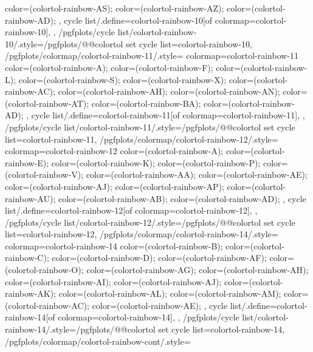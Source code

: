 {{{      color=(colortol-rainbow-AS);
      color=(colortol-rainbow-AZ);
      color=(colortol-rainbow-AD);
    },
    cycle list/.define={colortol-rainbow-10}{[of colormap=colortol-rainbow-10]},
  },
  /pgfplots/cycle list/colortol-rainbow-10/.style={/pgfplots/@@colortol set cycle list={colortol-rainbow-10}},
  /pgfplots/colormap/colortol-rainbow-11/.style={
    colormap={colortol-rainbow-11}{
      color=(colortol-rainbow-A);
      color=(colortol-rainbow-F);
      color=(colortol-rainbow-L);
      color=(colortol-rainbow-S);
      color=(colortol-rainbow-X);
      color=(colortol-rainbow-AC);
      color=(colortol-rainbow-AH);
      color=(colortol-rainbow-AN);
      color=(colortol-rainbow-AT);
      color=(colortol-rainbow-BA);
      color=(colortol-rainbow-AD);
    },
    cycle list/.define={colortol-rainbow-11}{[of colormap=colortol-rainbow-11]},
  },
  /pgfplots/cycle list/colortol-rainbow-11/.style={/pgfplots/@@colortol set cycle list={colortol-rainbow-11}},
  /pgfplots/colormap/colortol-rainbow-12/.style={
    colormap={colortol-rainbow-12}{
      color=(colortol-rainbow-A);
      color=(colortol-rainbow-E);
      color=(colortol-rainbow-K);
      color=(colortol-rainbow-P);
      color=(colortol-rainbow-V);
      color=(colortol-rainbow-AA);
      color=(colortol-rainbow-AE);
      color=(colortol-rainbow-AJ);
      color=(colortol-rainbow-AP);
      color=(colortol-rainbow-AU);
      color=(colortol-rainbow-AB);
      color=(colortol-rainbow-AD);
    },
    cycle list/.define={colortol-rainbow-12}{[of colormap=colortol-rainbow-12]},
  },
  /pgfplots/cycle list/colortol-rainbow-12/.style={/pgfplots/@@colortol set cycle list={colortol-rainbow-12}},
  /pgfplots/colormap/colortol-rainbow-14/.style={
    colormap={colortol-rainbow-14}{
      color=(colortol-rainbow-B);
      color=(colortol-rainbow-C);
      color=(colortol-rainbow-D);
      color=(colortol-rainbow-AF);
      color=(colortol-rainbow-O);
      color=(colortol-rainbow-AG);
      color=(colortol-rainbow-AH);
      color=(colortol-rainbow-AI);
      color=(colortol-rainbow-AJ);
      color=(colortol-rainbow-AK);
      color=(colortol-rainbow-AL);
      color=(colortol-rainbow-AM);
      color=(colortol-rainbow-AC);
      color=(colortol-rainbow-AE);
    },
    cycle list/.define={colortol-rainbow-14}{[of colormap=colortol-rainbow-14]},
  },
  /pgfplots/cycle list/colortol-rainbow-14/.style={/pgfplots/@@colortol set cycle list={colortol-rainbow-14}},
  /pgfplots/colormap/colortol-rainbow-cont/.style={
}}
